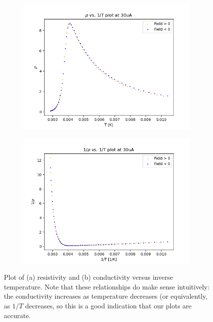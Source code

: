 \documentclass[10pt]{article}
\begin{document}
	\begin{figure}
		\centering
		\begin{subfigure}{0.45\textwidth}
			\includegraphics[width = \textwidth]{images/30uA-rho-plot1.png}
			\caption{}
		\end{subfigure}
		\begin{subfigure}{0.45\textwidth}
			\includegraphics[width = \textwidth]{images/30uA-rho-plot2.png}	
			\caption{}
		\end{subfigure}
		\caption{Plot of (a) resistivity and (b) conductivity versus inverse temperature. Note that these
			relationships do make sense intuitively: the conductivity increases as temperature decreases (or
		equivalently, as \( 1 / T \) decreases, so this is a good indication that our plots are accurate.}
		\label{rho-plot}
	\end{figure}
\end{document}
